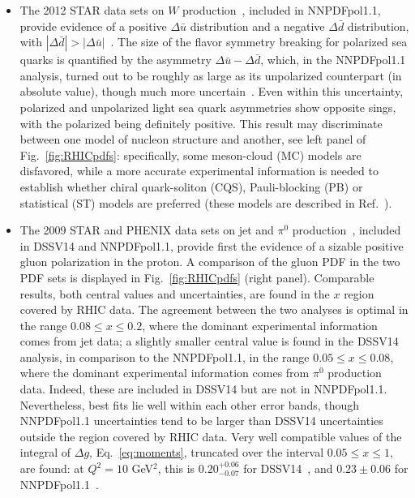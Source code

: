 \begin{itemize}

\item The 2012 STAR data sets on $W$ production~\cite{Adamczyk:2014xyw}, 
included in NNPDFpol1.1, provide evidence of a positive 
$\Delta\bar{u}$ distribution 
and a negative $\Delta\bar{d}$ distribution, with 
$|\Delta\bar{d}|>|\Delta\bar{u}|$~\cite{Nocera:2014gqa}.
% 
The size of the flavor symmetry breaking for polarized sea quarks is 
quantified by the asymmetry $\Delta\bar{u}-\Delta\bar{d}$, which,
in the NNPDFpol1.1 analysis, turned out to be roughly as large as its 
unpolarized counterpart (in absolute value), 
though much more uncertain~\cite{Nocera:2014rea}. 
%
Even within this uncertainty,
polarized and unpolarized light sea quark asymmetries show opposite sings,
with the polarized being definitely positive.  
%
This result may discriminate between one model of nucleon structure and 
another, see left panel of Fig.~\ref{fig:RHICpdfs}: 
specifically, some meson-cloud (MC) models are disfavored, while a more 
accurate experimental information is needed to establish whether 
chiral quark-soliton (CQS), Pauli-blocking (PB) or statistical (ST)
models are preferred (these models are described in 
Ref.~\cite{Chang:2014jba}).

\item The 2009 STAR and PHENIX data sets on jet and $\pi^0$ 
production~\cite{Adamczyk:2014ozi,Adare:2014hsq}, included in DSSV14
and NNPDFpol1.1, provide first the evidence
of a sizable positive gluon polarization in the proton. 
%
A comparison of the gluon PDF in the two PDF sets is displayed in 
Fig.~\ref{fig:RHICpdfs} (right panel). 
%
Comparable results, both central values and uncertainties, are found in the 
$x$ region covered by RHIC data. 
%
The agreement between the two analyses is optimal in the
range $0.08\leq x \leq 0.2$, where the dominant experimental information comes
from jet data; a slightly smaller central value is found in the DSSV14 
analysis, in comparison to the NNPDFpol1.1, in the range 
$0.05\leq x \leq 0.08$, where the dominant experimental information comes from 
$\pi^0$ production data. 
%
Indeed, these are included in DSSV14 but are not
in NNPDFpol1.1. 
%
Nevertheless, best fits lie well within each other error
bands, though NNPDFpol1.1 uncertainties tend to be larger than DSSV14
uncertainties outside the region covered by RHIC data.
%
Very well compatible values of the integral of $\Delta g$, 
Eq.~\eqref{eq:moments}, truncated over the interval $0.05\leq x \leq 1$, are 
found: at $Q^2=10$ GeV$^2$, this is $0.20^{+0.06}_{-0.07}$ for 
DSSV14~\cite{deFlorian:2014yva}, and $0.23\pm 0.06$ for 
NNPDFpol1.1~\cite{Nocera:2014gqa}.
\end{itemize}

